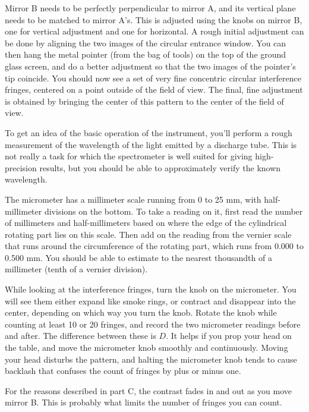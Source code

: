 Mirror B needs to be perfectly perpendicular to mirror A, and its vertical plane
needs to be matched to mirror A's. This is adjusted using the knobs on mirror B,
one for vertical adjustment and one for horizontal. A rough initial adjustment
can be done by aligning the two images of the circular entrance window. You can
then hang the metal pointer (from the bag of tools) on the top of the ground glass
screen, and do a better adjustment so that the two images of the pointer's
tip coincide. You should now see a set of very fine concentric circular interference
fringes, centered on a point outside of the field of view. The final, fine
adjustment is obtained by bringing the center of this pattern to the center of the
field of view.


To get an idea of the basic operation of the instrument, you'll perform a rough
measurement of the wavelength of the light emitted by a discharge tube.
This is not really a task for which the spectrometer is well suited for giving high-precision
results, but you should be able to approximately verify the known wavelength.

The micrometer has a millimeter scale running from 0 to 25 mm, with half-millimeter
divisions on the bottom. To take a reading on it, first read the number of
millimeters and half-millimeters based on where the edge of the cylindrical
rotating part lies on this scale. Then add on the reading from the vernier
scale that runs around the circumference of the rotating part, which runs from
0.000 to 0.500 mm. You should be able to estimate to the nearest thousandth of
a millimeter (tenth of a vernier division).

While looking at the interference fringes, turn the knob on the micrometer.
You will see them either expand like smoke rings, or contract and disappear
into the center, depending on which way you turn the knob. Rotate the knob
while counting at least 10 or 20 fringes, and record the two micrometer readings before and
after. The difference between these is $D$. It helps if you prop your head on the table, and move the micrometer knob
smoothly and continuously. Moving your head disturbs the pattern, and halting the
micrometer knob tends to cause backlash that confuses the count of fringes by
plus or minus one.

For the reasons described in part C, the contrast fades in and out as you
move mirror B. This is probably what limits the number of fringes you can count.

